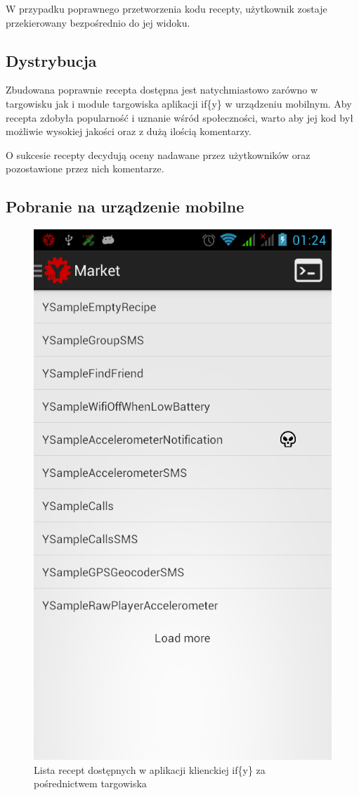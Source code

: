 \documentclass[11pt,a4paper,polish,thesis]{dcsbook}
\begin{document}
W przypadku poprawnego przetworzenia kodu recepty, użytkownik zostaje przekierowany bezpośrednio do jej widoku.
\subsection{Dystrybucja}
Zbudowana poprawnie recepta dostępna jest natychmiastowo zarówno w targowisku jak i module targowiska aplikacji if\{y\} w urządzeniu mobilnym. Aby recepta
zdobyła popularność i uznanie wśród społeczności, warto aby jej kod był możliwie wysokiej jakości oraz z dużą ilością komentarzy.

O sukcesie recepty decydują oceny nadawane przez użytkowników oraz pozostawione przez nich komentarze.
\subsection{Pobranie na urządzenie mobilne}
\begin{figure}[h]
  \centering
  \includegraphics[scale=0.3]{./resources/device_market.png}
  \caption{Lista recept dostępnych w aplikacji klienckiej if\{y\} 
za pośrednictwem targowiska}
  \label{fig:device_market}
\end{figure}
\end{document}
